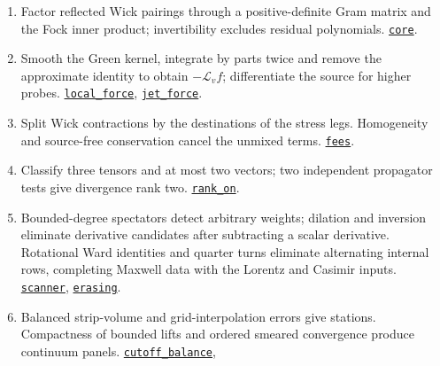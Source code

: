 \documentclass[
  letterpaper,
  11pt]{article}
\providecommand{\tightlist}{%
  \setlength{\itemsep}{0pt}\setlength{\parskip}{0pt}}
\begin{document}
\begin{enumerate}
\def\labelenumi{\arabic{enumi}.}
\tightlist
\item
  Factor reflected Wick pairings through a positive-definite Gram matrix
  and the Fock inner product; invertibility excludes residual
  polynomials.
  \href{https://github.com/yang-mills-group/OpenAI-YM-20261028/blob/3456e5e75cf8d4cd558955a5c7638fba2d68f464/YM/Next/MAXWELL/Core.lean\#L44-L92}{\texttt{core}}.
\item
  Smooth the Green kernel, integrate by parts twice and remove the
  approximate identity to obtain \(-\mathcal L_vf\); differentiate the
  source for higher probes.
  \href{https://github.com/yang-mills-group/OpenAI-YM-20261028/blob/3456e5e75cf8d4cd558955a5c7638fba2d68f464/YM/Next/MAXWELL/Contact.lean\#L137-L156}{\texttt{local\_force}},
  \href{https://github.com/yang-mills-group/OpenAI-YM-20261028/blob/3456e5e75cf8d4cd558955a5c7638fba2d68f464/YM/Next/MAXWELL/Force.lean\#L131-L186}{\texttt{jet\_force}}.
\item
  Split Wick contractions by the destinations of the stress legs.
  Homogeneity and source-free conservation cancel the unmixed terms.
  \href{https://github.com/yang-mills-group/OpenAI-YM-20261028/blob/3456e5e75cf8d4cd558955a5c7638fba2d68f464/YM/Next/MAXWELL/Taxes.lean\#L115-L172}{\texttt{fees}}.
\item
  Classify three tensors and at most two vectors; two independent
  propagator tests give divergence rank two.
  \href{https://github.com/yang-mills-group/OpenAI-YM-20261028/blob/3456e5e75cf8d4cd558955a5c7638fba2d68f464/YM/UVNext/FREE_STRESS_CERTIFICATE/Certificate.lean\#L43-L47}{\texttt{rank\_on}}.
\item
  Bounded-degree spectators detect arbitrary weights; dilation and
  inversion eliminate derivative candidates after subtracting a scalar
  derivative. Rotational Ward identities and quarter turns eliminate
  alternating internal rows, completing Maxwell data with the Lorentz
  and Casimir inputs.
  \href{https://github.com/yang-mills-group/OpenAI-YM-20261028/blob/3456e5e75cf8d4cd558955a5c7638fba2d68f464/YM/Next/MAXWELL/Scenes.lean\#L125-L132}{\texttt{scanner}},
  \href{https://github.com/yang-mills-group/OpenAI-YM-20261028/blob/3456e5e75cf8d4cd558955a5c7638fba2d68f464/YM/Next/MAXWELL/AwayTeam.lean\#L48-L118}{\texttt{erasing}}.
\item
  Balanced strip-volume and grid-interpolation errors give stations.
  Compactness of bounded lifts and ordered smeared convergence produce
  continuum panels.
  \href{https://github.com/yang-mills-group/OpenAI-YM-20261028/blob/3456e5e75cf8d4cd558955a5c7638fba2d68f464/YM/Next/UV_STRESS/Glide.lean\#L102-L129}{\texttt{cutoff\_balance}},

\end{enumerate}
\end{document}
